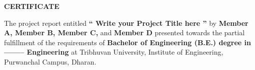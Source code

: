 \documentclass[a4paper, 12pt ]{report}
\begin{document}
	\newpage
	\cleardoublepage
	\setcounter{page}{3}
	\begin{center}\fontsize{18}{0} \textbf{CERTIFICATE}\end{center}
	\vspace*{\baselineskip}
	{\normalsize The project report entitled {\bf `` Write your Project Title here ”}  by {\bf Member A, Member B, Member C,} and {\bf Member D} presented towards the partial fulfillment of the requirements of {\bf Bachelor of Engineering (B.E.) degree in -------- Engineering } at Tribhuvan University, Institute of Engineering, Purwanchal Campus, Dharan. }
	\\
	\\
\end{document}
